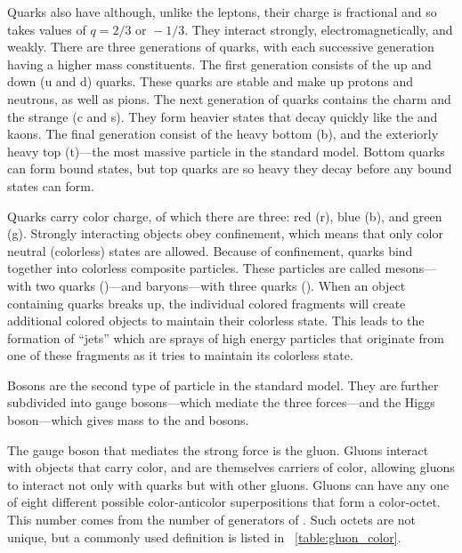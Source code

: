 Quarks also have \spinhalf although, unlike the leptons, their charge is
fractional and so takes values of $q = 2/3 \text{ or } -1/3$. They interact
strongly, electromagnetically, and weakly. There are three generations of
quarks, with each successive generation having a higher mass constituents. The
first generation consists of the up and down (u and d) quarks. These quarks are
stable and make up protons and neutrons, as well as pions. The next generation
of quarks contains the charm and the strange (c and s). They form heavier
states that decay quickly like the \jpsi and kaons. The final generation
consist of the heavy bottom (b), and the exteriorly heavy top (t)---the most
massive particle in the standard model. Bottom quarks can form bound states,
but top quarks are so heavy they decay before any bound states can form.

Quarks carry color charge, of which there are three: red (r),
blue (b), and green (g). Strongly interacting objects obey confinement, which
means that only color neutral (colorless) states are allowed. Because of
confinement, quarks bind together into colorless composite particles. These
particles are called mesons---with two quarks (\qqbar)---and baryons---with
three quarks (\baryon). When an object containing quarks breaks up, the
individual colored fragments will create additional colored objects to maintain
their colorless state. This leads to the formation of ``jets'' which are sprays
of high energy particles that originate from one of these fragments as it tries
to maintain its colorless state.

Bosons are the second type of particle in the standard model. They are further
subdivided into gauge bosons---which mediate the three forces---and the Higgs
boson---which gives mass to the \W and \Z bosons.

The gauge boson that mediates the strong force is the gluon. Gluons interact
with objects that carry color, and are themselves carriers of color, allowing
gluons to interact not only with quarks but with other gluons. Gluons can have
any one of eight different possible color-anticolor superpositions that form a
color-octet. This number comes from the number of generators of \SUthree. Such
octets are not unique, but a commonly used definition is listed in
\TAB~\ref{table:gluon_color}.

